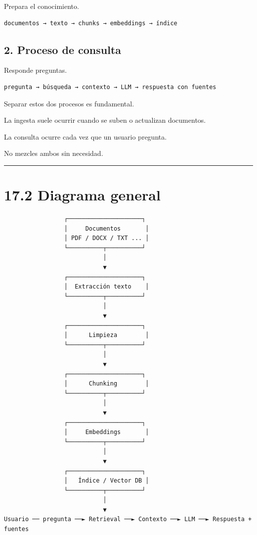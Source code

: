 Prepara el conocimiento.

\begin{lstlisting}
documentos → texto → chunks → embeddings → índice
\end{lstlisting}

\subsection{2. Proceso de consulta}\label{proceso-de-consulta}

Responde preguntas.

\begin{lstlisting}
pregunta → búsqueda → contexto → LLM → respuesta con fuentes
\end{lstlisting}

Separar estos dos procesos es fundamental.

La ingesta suele ocurrir cuando se suben o actualizan documentos.

La consulta ocurre cada vez que un usuario pregunta.

No mezcles ambos sin necesidad.

\begin{center}\rule{0.5\linewidth}{0.5pt}\end{center}

\section{17.2 Diagrama general}\label{diagrama-general}

\begin{lstlisting}
                 ┌─────────────────────┐
                 │     Documentos       │
                 │ PDF / DOCX / TXT ... │
                 └──────────┬──────────┘
                            │
                            ▼
                 ┌─────────────────────┐
                 │  Extracción texto    │
                 └──────────┬──────────┘
                            │
                            ▼
                 ┌─────────────────────┐
                 │      Limpieza        │
                 └──────────┬──────────┘
                            │
                            ▼
                 ┌─────────────────────┐
                 │      Chunking        │
                 └──────────┬──────────┘
                            │
                            ▼
                 ┌─────────────────────┐
                 │     Embeddings       │
                 └──────────┬──────────┘
                            │
                            ▼
                 ┌─────────────────────┐
                 │   Índice / Vector DB │
                 └──────────┬──────────┘
                            │
                            ▼
Usuario ── pregunta ──► Retrieval ──► Contexto ──► LLM ──► Respuesta + fuentes
\end{lstlisting}

